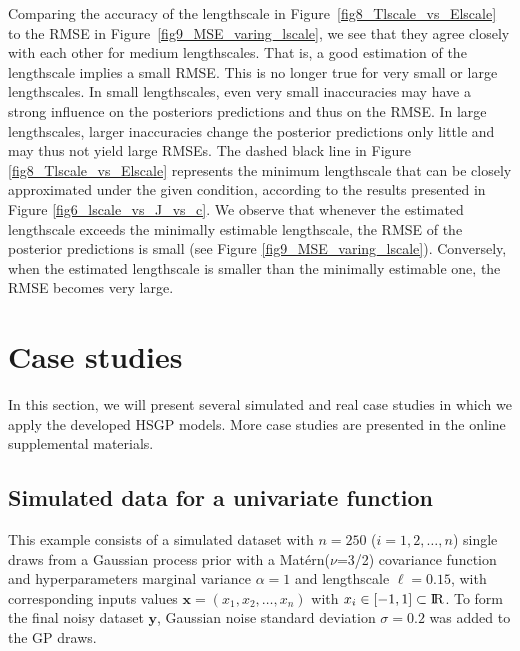\documentclass[onecolumn,a4paper,11pt]{article}
\begin{document}
Comparing the accuracy of the lengthscale in Figure~\ref{fig8_Tlscale_vs_Elscale} to the RMSE in Figure~\ref{fig9_MSE_varing_lscale}, we see that they agree closely with each other for medium lengthscales. That is, a good estimation of the lengthscale implies a small RMSE. This is no longer true for very small or large lengthscales. In small lengthscales, even very small inaccuracies  may have a strong influence on the posteriors predictions and thus on the RMSE. In large lengthscales, larger inaccuracies change the posterior predictions only little and may thus not yield large RMSEs. The dashed black line in Figure \ref{fig8_Tlscale_vs_Elscale} represents the  minimum lengthscale that can be closely approximated under the given condition, according to the results presented in Figure \ref{fig6_lscale_vs_J_vs_c}.  We observe that whenever the estimated lengthscale exceeds the minimally estimable lengthscale, the RMSE of the posterior predictions is small
(see Figure \ref{fig9_MSE_varing_lscale}). Conversely, when the estimated lengthscale is smaller than the minimally estimable one, the RMSE becomes very large.


\section{Case studies}\label{ch5_sec_cases}

In this section, we will present several simulated and real case studies in which we apply the developed HSGP models. More case studies are presented in the online supplemental materials.

\subsection{Simulated data for a univariate function}\label{ch5_sec_univariate_simu}

This example consists of a simulated dataset with $n=250$ ($i=1,2,\dots,n$) single draws from a Gaussian process prior with a Mat{\'e}rn($\nu$=3/2) covariance function and hyperparameters marginal variance $\alpha=1$ and lengthscale $\ell=0.15$, with corresponding inputs values $\bm{x}=(x_1,x_2,\dots,x_n)$ with $x_i \in [-1,1] \subset {\rm I\!R}$. To form the final noisy dataset $\bm{y}$, Gaussian noise standard deviation $\sigma=0.2$ was added to the GP draws.
\end{document}
